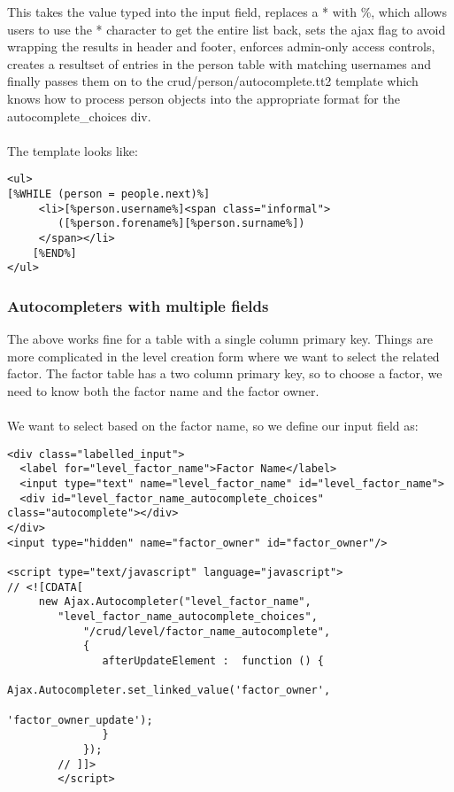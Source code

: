 This takes the value typed into the input field, replaces a * with \%, which allows users to use the * character to get the entire list back, sets the ajax flag to avoid wrapping the results in header and footer, enforces admin-only access controls, creates a resultset of entries in the person table with matching usernames and finally passes them on to the crud/person/autocomplete.tt2 template which knows how to process person objects into the appropriate format for the autocomplete\_choices div.

\paragraph*{}
The template looks like:

\begin{verbatim}
<ul>
[%WHILE (person = people.next)%]
     <li>[%person.username%]<span class="informal">
        ([%person.forename%][%person.surname%])
     </span></li>  
    [%END%]
</ul>
\end{verbatim}



\subsubsection*{Autocompleters with multiple fields}
The above works fine for a table with a single column primary key. Things are more complicated in the level creation form where we want to select the related factor. The factor table has a two column primary key, so to choose a factor, we need to know both the factor name and the factor owner. 

\paragraph*{}
We want to select based on the factor name, so we define our input field as:

\begin{verbatim}
<div class="labelled_input">
  <label for="level_factor_name">Factor Name</label>
  <input type="text" name="level_factor_name" id="level_factor_name">
  <div id="level_factor_name_autocomplete_choices" class="autocomplete"></div>
</div>
<input type="hidden" name="factor_owner" id="factor_owner"/>

<script type="text/javascript" language="javascript">
// <![CDATA[
     new Ajax.Autocompleter("level_factor_name",
	    "level_factor_name_autocomplete_choices",
            "/crud/level/factor_name_autocomplete",
            {           
               afterUpdateElement :  function () {                                   
                    Ajax.Autocompleter.set_linked_value('factor_owner',
                                                        'factor_owner_update');
               } 
            });
        // ]]>
        </script>

\end{verbatim}

